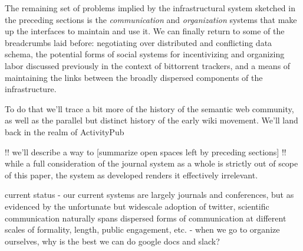 \documentclass[10pt]{article}
\begin{document}
\begin{multicols}{2}
 The remaining set of problems implied by the
infrastructural system sketched in the preceding sections is the
\emph{communication} and \emph{organization} systems that make up the
interfaces to maintain and use it. We can finally return to some of the
breadcrumbs laid before: negotiating over distributed and conflicting
data schema, the potential forms of social systems for incentivizing and
organizing labor discussed previously in the context of bittorrent
trackers, and a means of maintaining the links between the broadly
dispersed components of the infrastructure.

To do that we'll trace a bit more of the history of the semantic web
community, as well as the parallel but distinct history of the early
wiki movement. We'll land back in the realm of ActivityPub

!! we'll describe a way to {[}summarize open spaces left by preceding
sections{]} !! while a full consideration of the journal system as a
whole is strictly out of scope of this paper, the system as developed
renders it effectively irrelevant.

current status - our current systems are largely journals and
conferences, but as evidenced by the unfortunate but widescale adoption
of twitter, scientific communication naturally spans dispersed forms of
communication at different scales of formality, length, public
engagement, etc. - when we go to organize ourselves, why is the best we
can do google docs and slack?


\end{multicols}
\end{document}
